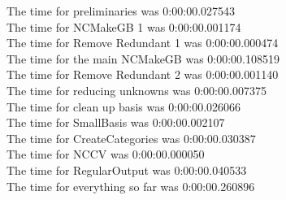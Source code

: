 \documentclass[rep10,leqno]{report}
\begin{document}
\noindent
The time for preliminaries was 0:00:00.027543\\
The time for NCMakeGB 1 was 0:00:00.001174\\
The time for Remove Redundant 1 was 0:00:00.000474\\
The time for the main NCMakeGB was 0:00:00.108519\\
The time for Remove Redundant 2 was 0:00:00.001140\\
The time for reducing unknowns was 0:00:00.007375\\
The time for clean up basis was 0:00:00.026066\\
The time for SmallBasis was 0:00:00.002107\\
The time for CreateCategories was 0:00:00.030387\\
The time for NCCV was 0:00:00.000050\\
The time for RegularOutput was 0:00:00.040533\\
The time for everything so far was 0:00:00.260896\\
\end{document}
